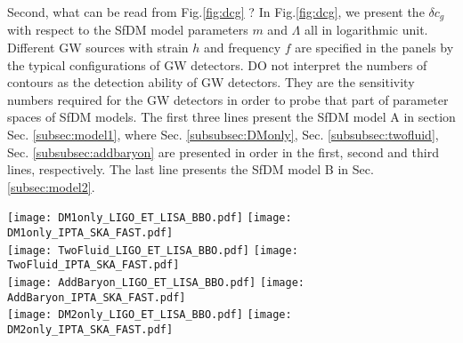 \documentclass[aps,prd,twocolumn,10pt,groupedaddress]{revtex4-1}
\begin{document}
Second, what can be read from Fig.\ref{fig:dcg} ? In Fig.\ref{fig:dcg}, we present the $\delta c_g$ with respect to the SfDM model parameters $m$ and $\Lambda$ all in logarithmic unit. Different GW sources with strain $h$ and frequency $f$ are specified in the panels by the typical configurations of GW detectors. DO not interpret the numbers of contours as the detection ability of GW detectors. They are the sensitivity numbers required for the GW detectors in order to probe that part of parameter spaces of SfDM models. The first three lines present the SfDM model A in section Sec. \ref{subsec:model1}, where Sec. \ref{subsubsec:DMonly}, Sec. \ref{subsubsec:twofluid}, Sec. \ref{subsubsec:addbaryon} are presented in order in the first, second and third lines, respectively. The last line presents the SfDM model B in Sec. \ref{subsec:model2}.
\begin{figure*}
  \centering
  \texttt{[image: DM1only\_LIGO\_ET\_LISA\_BBO.pdf]}\qquad\qquad
  \texttt{[image: DM1only\_IPTA\_SKA\_FAST.pdf]}\\
  \texttt{[image: TwoFluid\_LIGO\_ET\_LISA\_BBO.pdf]}\qquad\qquad
  \texttt{[image: TwoFluid\_IPTA\_SKA\_FAST.pdf]}\\
  \texttt{[image: AddBaryon\_LIGO\_ET\_LISA\_BBO.pdf]}\qquad\qquad
  \texttt{[image: AddBaryon\_IPTA\_SKA\_FAST.pdf]}\\
  \texttt{[image: DM2only\_LIGO\_ET\_LISA\_BBO.pdf]}\qquad\qquad
  \texttt{[image: DM2only\_IPTA\_SKA\_FAST.pdf]}\\
  \caption{The change in the speed of GWs propagating through SfDM halo as a function of the mass of SfDM particle $m$ and the characteristic energy scale $\Lambda$ for different models in logarithmic unit. The first three lines are all for model A with superfluid phase (first line) without baryons, two-fluid phases (second line) without baryons, and superfluid phase (third line) with baryons, while the last line is for model B. Different GW detectors are labeled by various colors as clarified in the corners of each figure. The specific configurations of different GW detectors are listed in \eqref{eq:LIGO}, \eqref{eq:ET}, \eqref{eq:LISA}, \eqref{eq:BBO}, \eqref{eq:IPTA}, \eqref{eq:FAST}, \eqref{eq:SKA}, respectively.}\label{}\label{fig:dcg}
\end{figure*}
\end{document}
